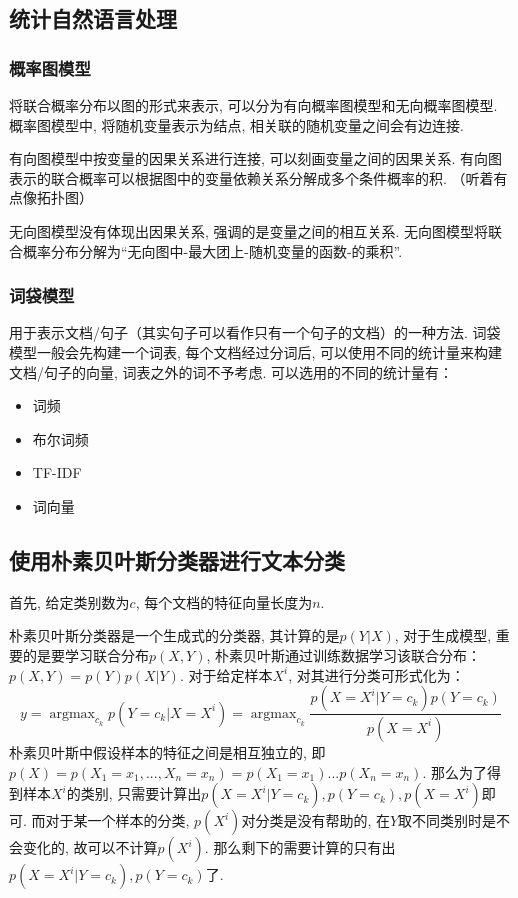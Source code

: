 \subsection{统计自然语言处理}



\subsubsection{概率图模型}
将联合概率分布以图的形式来表示, 可以分为有向概率图模型和无向概率图模型. 
概率图模型中, 将随机变量表示为结点, 相关联的随机变量之间会有边连接. 

有向图模型中按变量的因果关系进行连接, 可以刻画变量之间的因果关系. 有向图表示的联合概率可以根据图中的变量依赖关系分解成多个条件概率的积. （听着有点像拓扑图）

无向图模型没有体现出因果关系, 强调的是变量之间的相互关系. 无向图模型将联合概率分布分解为“无向图中-最大团上-随机变量的函数-的乘积”. 





\subsubsection{词袋模型}
用于表示文档/句子（其实句子可以看作只有一个句子的文档）的一种方法. 
词袋模型一般会先构建一个词表, 每个文档经过分词后, 可以使用不同的统计量来构建文档/句子的向量, 词表之外的词不予考虑. 可以选用的不同的统计量有：
\begin{itemize}
	\item 词频
	\item 布尔词频
	\item TF-IDF
	\item 词向量
\end{itemize}

\subsection{使用朴素贝叶斯分类器进行文本分类}
首先, 给定类别数为$c$, 每个文档的特征向量长度为$n$. 

朴素贝叶斯分类器是一个生成式的分类器, 其计算的是$p(Y | X)$, 对于生成模型, 重要的是要学习联合分布$p(X, Y)$, 朴素贝叶斯通过训练数据学习该联合分布：$p(X, Y) = p(Y)p(X|Y)$. 对于给定样本$X^i$, 对其进行分类可形式化为：
$$
y = \mathop{argmax}_{c_k} p(Y=c_k | X=X^i) = \mathop{argmax}_{c_k} \frac{p(X=X^i | Y=c_k) p(Y=c_k)}{p(X=X^i)}
$$
朴素贝叶斯中假设样本的特征之间是相互独立的, 即$p(X)=p(X_1=x_1, ..., X_n=x_n) = p(X_1=x_1) ... p(X_n=x_n)$. 那么为了得到样本$X^i$的类别, 只需要计算出$p(X=X^i | Y=c_k),  p(Y=c_k), p(X=X^i)$即可. 而对于某一个样本的分类, $p(X^i)$对分类是没有帮助的, 在$Y$取不同类别时是不会变化的, 故可以不计算$p(X^i)$. 那么剩下的需要计算的只有出$p(X=X^i | Y=c_k),  p(Y=c_k)$了. 

